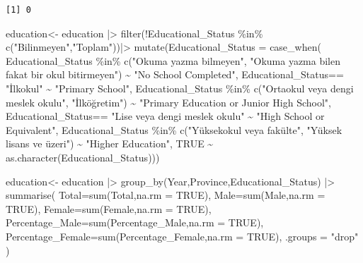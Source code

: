 \documentclass[
  11pt,
  a4paper,
  DIV=11,
  numbers=noendperiod]{scrartcl}
\newenvironment{Shaded}{\begin{snugshade}}{\end{snugshade}}
\newcommand{\AttributeTok}[1]{\textcolor[rgb]{0.40,0.45,0.13}{#1}}
\newcommand{\ConstantTok}[1]{\textcolor[rgb]{0.56,0.35,0.01}{#1}}
\newcommand{\FunctionTok}[1]{\textcolor[rgb]{0.28,0.35,0.67}{#1}}
\newcommand{\NormalTok}[1]{\textcolor[rgb]{0.00,0.23,0.31}{#1}}
\newcommand{\OtherTok}[1]{\textcolor[rgb]{0.00,0.23,0.31}{#1}}
\newcommand{\SpecialCharTok}[1]{\textcolor[rgb]{0.37,0.37,0.37}{#1}}
\newcommand{\StringTok}[1]{\textcolor[rgb]{0.13,0.47,0.30}{#1}}
\begin{document}
\begin{verbatim}
[1] 0
\end{verbatim}

\begin{Shaded}
\begin{Highlighting}[]
\NormalTok{ education}\OtherTok{\textless{}{-}}\NormalTok{ education }\SpecialCharTok{|\textgreater{}} \FunctionTok{filter}\NormalTok{(}\SpecialCharTok{!}\NormalTok{Educational\_Status }\SpecialCharTok{\%in\%} \FunctionTok{c}\NormalTok{(}\StringTok{"Bilinmeyen"}\NormalTok{,}\StringTok{"Toplam"}\NormalTok{))}\SpecialCharTok{|\textgreater{}}
  \FunctionTok{mutate}\NormalTok{(}\AttributeTok{Educational\_Status =} \FunctionTok{case\_when}\NormalTok{(}
\NormalTok{    Educational\_Status }\SpecialCharTok{\%in\%} \FunctionTok{c}\NormalTok{(}\StringTok{"Okuma yazma bilmeyen"}\NormalTok{, }\StringTok{"Okuma yazma bilen fakat bir okul bitirmeyen"}\NormalTok{) }\SpecialCharTok{\textasciitilde{}} \StringTok{"No School Completed"}\NormalTok{,}
\NormalTok{    Educational\_Status}\SpecialCharTok{==} \StringTok{"İlkokul"} \SpecialCharTok{\textasciitilde{}} \StringTok{"Primary School"}\NormalTok{,}
\NormalTok{    Educational\_Status }\SpecialCharTok{\%in\%} \FunctionTok{c}\NormalTok{(}\StringTok{"Ortaokul veya dengi meslek okulu"}\NormalTok{, }\StringTok{"İlköğretim"}\NormalTok{) }\SpecialCharTok{\textasciitilde{}} \StringTok{"Primary Education or Junior High School"}\NormalTok{,}
\NormalTok{    Educational\_Status}\SpecialCharTok{==} \StringTok{"Lise veya dengi meslek okulu"} \SpecialCharTok{\textasciitilde{}} \StringTok{"High School or Equivalent"}\NormalTok{,}
\NormalTok{    Educational\_Status }\SpecialCharTok{\%in\%} \FunctionTok{c}\NormalTok{(}\StringTok{"Yüksekokul veya fakülte"}\NormalTok{, }\StringTok{"Yüksek lisans ve üzeri"}\NormalTok{) }\SpecialCharTok{\textasciitilde{}} \StringTok{"Higher Education"}\NormalTok{,}
    \ConstantTok{TRUE} \SpecialCharTok{\textasciitilde{}} \FunctionTok{as.character}\NormalTok{(Educational\_Status))) }
  
\NormalTok{  education}\OtherTok{\textless{}{-}}\NormalTok{ education }\SpecialCharTok{|\textgreater{}}  \FunctionTok{group\_by}\NormalTok{(Year,Province,Educational\_Status) }\SpecialCharTok{|\textgreater{}}
  \FunctionTok{summarise}\NormalTok{(}
    \AttributeTok{Total=}\FunctionTok{sum}\NormalTok{(Total,}\AttributeTok{na.rm =} \ConstantTok{TRUE}\NormalTok{),}
    \AttributeTok{Male=}\FunctionTok{sum}\NormalTok{(Male,}\AttributeTok{na.rm =} \ConstantTok{TRUE}\NormalTok{),}
    \AttributeTok{Female=}\FunctionTok{sum}\NormalTok{(Female,}\AttributeTok{na.rm =} \ConstantTok{TRUE}\NormalTok{),}
    \AttributeTok{Percentage\_Male=}\FunctionTok{sum}\NormalTok{(Percentage\_Male,}\AttributeTok{na.rm =} \ConstantTok{TRUE}\NormalTok{),}
    \AttributeTok{Percentage\_Female=}\FunctionTok{sum}\NormalTok{(Percentage\_Female,}\AttributeTok{na.rm =} \ConstantTok{TRUE}\NormalTok{),}
    \AttributeTok{.groups =} \StringTok{"drop"}
\NormalTok{  )}
  

\end{Highlighting}
\end{Shaded}
\end{document}
